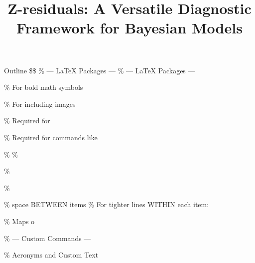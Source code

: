 \documentclass[
  ignorenonframetext,
]{beamer}
\title{\texorpdfstring{Z-residuals: A Versatile Diagnostic Framework for
Bayesian
Models}{Z-residuals: A Versatile Diagnostic Framework for Bayesian Models}}
\author{}
\date{}
\begin{document}
\frame{\titlepage}


\begin{frame}{Outline}
\protect{}\label{outline}
\$\$ \% --- LaTeX Packages --- \% --- LaTeX Packages ---

\usepackage{amsmath}
\usepackage{amsthm}

\% For bold math symbols

\usepackage{graphicx}

\% For including images

\usepackage{xcolor}

\% Required for \highlight

\usepackage{xspace}

\% Required for commands like \nref

\usepackage{tikz}

\%\usetikzlibrary{arrows.meta} \%

\usepackage{mathtools}

\%

\usepackage{filecontents}
\usepackage{booktabs}

\%

\usepackage{placeins}
\usepackage{hyperref}
        \hypersetup{
          colorlinks=true,
          linkcolor=blue,
          urlcolor=blue,
          citecolor=blue
        }
\usepackage{etoolbox}

\setlength{\bibsep}{5pt plus 5pt} \% space BETWEEN items \% For tighter
lines WITHIN each item:

\usepackage{setspace}

\newcommand{\bm}[1]{\boldsymbol{#1}}

\% Maps \bm to \boldsymbol

\% --- Custom Commands ---

\% Acronyms and Custom Text \newcommand{\CVIC}{\text{CVIC}}
\newcommand{\deviance}{\text{dev}} \newcommand{\dpois}{\text{dpois}}
\newcommand{\ic}{\text{ic}} \newcommand{\nmsp}{\text{\scriptsize NMSP}}
\newcommand{\nrsp}{\text{\scriptsize NRSP}}
\newcommand{\pmin}{p_{\text{\scriptsize min}}}
\newcommand{\pp}{\text{pp}} \newcommand{\nref}{[\textbf{references}]}
\newcommand{\SP}{survival probability\xspace}
\newcommand{\SPs}{survival probabilities\xspace}
\newcommand{\svf}{S_{i}(\cdot)} \newcommand{\unif}[0]{\text{Unif}}
\newcommand{\rsp}[0]{\text{RSP}} \newcommand{\msp}[0]{\text{MSP}}
\newcommand{\PPP}[0]{\text{PPP}} \newcommand{\PPPs}[0]{\text{PPPs}}
\newcommand{\PPC}[0]{\text{PPC}} \newcommand{\bU}[0]{\bm{U}}
\newcommand{\pv}[0]{\mathcal{P}}


\end{frame}
\end{document}

